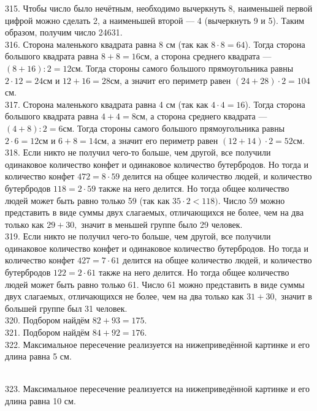 315. Чтобы число было нечётным, необходимо вычеркнуть 8, наименьшей первой цифрой можно сделать 2, а наименьшей второй --- 4 (вычеркнуть 9 и 5). Таким образом, получим число 24631.\\
316. Сторона маленького квадрата равна 8 см (так как $8\cdot8=64$). Тогда сторона большого квадрата равна $8+8=16$см, а сторона среднего квадрата --- $(8+16):2=12$см. Тогда стороны самого большого прямоугольника равны $2\cdot12=24$см и $12+16=28$см, а значит его периметр равен $(24+28)\cdot2=104$см.\\
317. Сторона маленького квадрата равна 4 см (так как $4\cdot4=16$). Тогда сторона большого квадрата равна $4+4=8$см, а сторона среднего квадрата --- $(4+8):2=6$см. Тогда стороны самого большого прямоугольника равны $2\cdot6=12$см и $6+8=14$см, а значит его периметр равен $(12+14)\cdot2=52$см.\\
318. Если никто не получил чего-то больше, чем другой, все получили одинаковое количество конфет и одинаковое количество бутербродов. Но тогда и количество конфет $472=8\cdot59$ делится на общее количество людей, и количество бутербродов $118=2\cdot59$ также на него делится. Но тогда общее количество людей может быть равно только 59 (так как $35\cdot2<118).$ Число 59 можно представить в виде суммы двух слагаемых, отличающихся не более, чем на два только как $29+30,$ значит в меньшей группе было 29 человек.\\
319. Если никто не получил чего-то больше, чем другой, все получили одинаковое количество конфет и одинаковое количество бутербродов. Но тогда и количество конфет $427=7\cdot61$ делится на общее количество людей, и количество бутербродов $122=2\cdot61$ также на него делится. Но тогда общее количество людей может быть равно только 61.  Число 61 можно представить в виде суммы двух слагаемых, отличающихся не более, чем на два только как $31+30,$ значит в большей группе был 31 человек.\\
320. Подбором найдём $82+93=175.$\\
321. Подбором найдём $84+92=176.$\\
322. Максимальное пересечение реализуется на нижеприведённой картинке и его длина равна 5 см.\\
\begin{figure}[ht!]
\end{figure}\\
323. Максимальное пересечение реализуется на нижеприведённой картинке и его длина равна 10 см.\\
